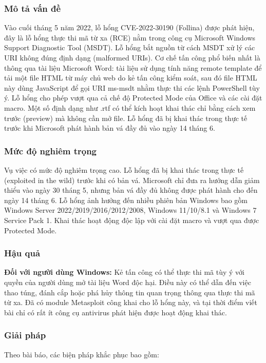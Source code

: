 \subsubsection{Mô tả vấn đề}
Vào cuối tháng 5 năm 2022, lỗ hổng CVE-2022-30190 (Follina) được phát hiện, đây là lỗ hổng thực thi mã từ xa (RCE) nằm trong công cụ Microsoft Windows Support Diagnostic Tool (MSDT). Lỗ hổng bắt nguồn từ cách MSDT xử lý các URI không đúng định dạng (malformed URIs). Cơ chế tấn công phổ biến nhất là thông qua tài liệu Microsoft Word: tài liệu sử dụng tính năng remote template để tải một file HTML từ máy chủ web do kẻ tấn công kiểm soát, sau đó file HTML này dùng JavaScript để gọi URI ms-msdt nhằm thực thi các lệnh PowerShell tùy ý. Lỗ hổng cho phép vượt qua cả chế độ Protected Mode của Office và các cài đặt macro. Một số định dạng như .rtf có thể kích hoạt khai thác chỉ bằng cách xem trước (preview) mà không cần mở file. Lỗ hổng đã bị khai thác trong thực tế trước khi Microsoft phát hành bản vá đầy đủ vào ngày 14 tháng 6.

\subsubsection{Mức độ nghiêm trọng}
Vụ việc có mức độ nghiêm trọng cao. Lỗ hổng đã bị khai thác trong thực tế (exploited in the wild) trước khi có bản vá. Microsoft chỉ đưa ra hướng dẫn giảm thiểu vào ngày 30 tháng 5, nhưng bản vá đầy đủ không được phát hành cho đến ngày 14 tháng 6. Lỗ hổng ảnh hưởng đến nhiều phiên bản Windows bao gồm Windows Server 2022/2019/2016/2012/2008, Windows 11/10/8.1 và Windows 7 Service Pack 1. Khai thác hoạt động độc lập với cài đặt macro và vượt qua được Protected Mode.

\subsubsection{Hậu quả}
\textbf{Đối với người dùng Windows:} Kẻ tấn công có thể thực thi mã tùy ý với quyền của người dùng mở tài liệu Word độc hại. Điều này có thể dẫn đến việc thao túng, đánh cắp hoặc phá hủy thông tin quan trọng thông qua thực thi mã từ xa. Đã có module Metasploit công khai cho lỗ hổng này, và tại thời điểm viết bài chỉ có rất ít công cụ antivirus phát hiện được hoạt động khai thác.

\subsubsection{Giải pháp}
Theo bài báo, các biện pháp khắc phục bao gồm:

